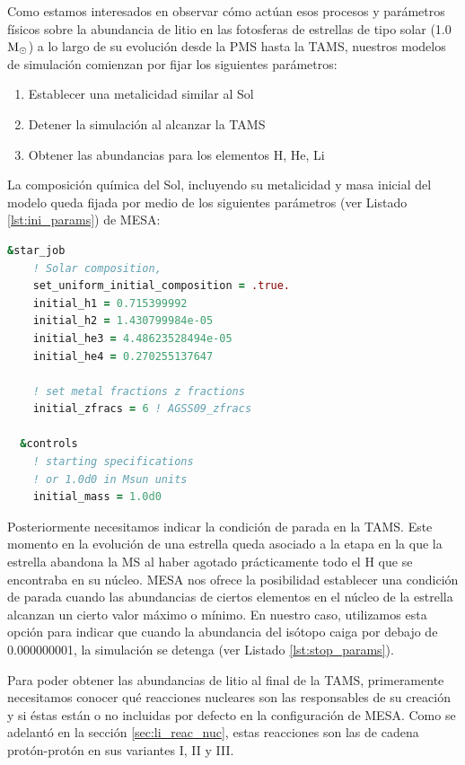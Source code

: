 Como estamos interesados en observar cómo actúan esos procesos y parámetros físicos sobre la abundancia de litio en las fotosferas de estrellas de tipo solar (1.0 $\mathrm{M}_\odot$) a lo largo de su evolución desde la PMS hasta la TAMS, nuestros modelos de simulación comienzan por fijar los siguientes parámetros:

\begin{enumerate}
    \item Establecer una metalicidad similar al Sol
    \item Detener la simulación al alcanzar la TAMS
    \item Obtener las abundancias para los elementos H, He, Li
\end{enumerate}

La composición química del Sol, incluyendo su metalicidad y masa inicial del modelo queda fijada por medio de los siguientes parámetros (ver Listado \ref{lst:ini_params}) de MESA:

\begin{lstlisting}[language=Fortran, float, caption={Parametrización de la metalicidad y masa inicial de la estrella}, label={lst:ini_params}]
  &star_job
    ! Solar composition, 
    set_uniform_initial_composition = .true.
    initial_h1 = 0.715399992
    initial_h2 = 1.430799984e-05
    initial_he3 = 4.48623528494e-05
    initial_he4 = 0.270255137647

    ! set metal fractions z fractions
    initial_zfracs = 6 ! AGSS09_zfracs

  &controls
    ! starting specifications
    ! or 1.0d0 in Msun units
    initial_mass = 1.0d0 
\end{lstlisting}

Posteriormente necesitamos indicar la condición de parada en la TAMS. Este momento en la evolución de una estrella queda asociado a la etapa en la que la estrella abandona la MS al haber agotado prácticamente todo el H que se encontraba en su núcleo. MESA nos ofrece la posibilidad establecer una condición de parada cuando las abundancias de ciertos elementos en el núcleo de la estrella alcanzan un cierto valor máximo o mínimo. En nuestro caso, utilizamos esta opción para indicar que cuando la abundancia del isótopo  caiga por debajo de 0.000000001, la simulación se detenga (ver Listado \ref{lst:stop_params}).\par

Para poder obtener las abundancias de litio al final de la TAMS, primeramente necesitamos conocer qué reacciones nucleares son las responsables de su creación y si éstas están o no incluidas por defecto en la configuración de MESA. Como se adelantó en la sección \ref{sec:li_reac_nuc}, estas reacciones son las de cadena protón-protón en sus variantes I, II y III.\par

